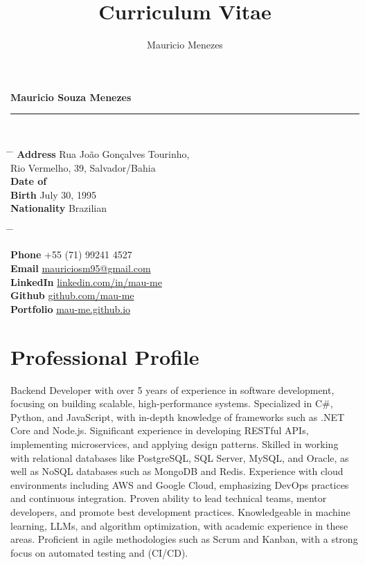\documentclass{article}
\title{Curriculum Vitae}
\author{Mauricio Menezes}
\begin{document}
{\huge{\color{slateblue}\textbf{Mauricio Souza Menezes}}} \\
\rule{\textwidth}{0.5mm} \\

\parbox{0.5\textwidth}{
  \begin{tabbing}
    \hspace{3cm} \= \hspace{4cm} \= \kill
    {\bf Address} \> Rua João Gonçalves Tourinho, \\
    \> Rio Vermelho, 39, Salvador/Bahia \\
    {\bf Date of} \\
    {\bf Birth} \> July 30, 1995 \\
    {\bf Nationality} \> Brazilian
  \end{tabbing}
}\hfil\parbox{0.5\textwidth}{
  \begin{tabbing}
    \hspace{3cm} \= \hspace{4cm} \= \kill

    {\bf Phone}
    \> +55 (71) 99241 4527 \\

    {\bf Email} \>
    \href{mailto:mauriciosm95@gmail.com}{mauriciosm95@gmail.com} \\

    {\bf LinkedIn} \>
    \href{https://www.linkedin.com/in/mau-me/}{linkedin.com/in/mau-me} \\

    {\bf Github} \>
    \href{https://github.com/mau-me}{github.com/mau-me} \\

    {\bf Portfolio} \>
    \href{https://mau-me.github.io/}{mau-me.github.io} \\
  \end{tabbing}
}

\section*{Professional Profile}

Backend Developer with over 5 years of experience in software development, focusing on building scalable, high-performance systems. Specialized in C\#, Python, and JavaScript, with in-depth knowledge of frameworks such as {.NET} Core and Node.js. Significant experience in developing RESTful APIs, implementing microservices, and applying design patterns. Skilled in working with relational databases like PostgreSQL, SQL Server, MySQL, and Oracle, as well as NoSQL databases such as {MongoDB} and Redis. Experience with cloud environments including AWS and Google Cloud, emphasizing DevOps practices and continuous integration. Proven ability to lead technical teams, mentor developers, and promote best development practices. Knowledgeable in machine learning, LLMs, and algorithm optimization, with academic experience in these areas. Proficient in agile methodologies such as Scrum and Kanban, with a strong focus on automated testing and (CI/CD).
\end{document}
